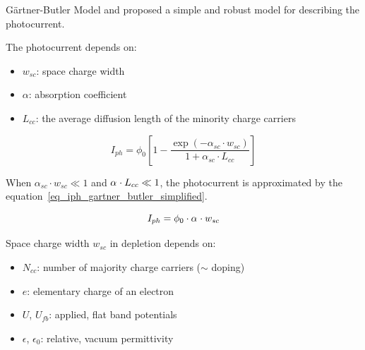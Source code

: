 \documentclass[10pt,compress]{beamer}
\begin{document}
    \begin{frame}[allowframebreaks=1.0]{Gärtner-Butler Model}
        \citet{gartner1959} and \citet{butler1977} proposed a simple and robust model for 
        describing the photocurrent.
        
        The photocurrent depends on:  
            \begin{itemize}
                \item $w_{sc}$: space charge width 
                \item $\alpha$: absorption coefficient
                \item $L_{cc }$: the average diffusion length of the minority charge carriers
            \end{itemize}

        \begin{equation}
            I_{ph} = \phi _0 \left[ 1 - \frac{\exp (-\alpha _{sc} \cdot w_{sc})}{1+\alpha _{sc} \cdot
            L_{cc}} \right]
            \label{eq_iph_gartner_butler}
        \end{equation}
        
        When $\alpha _{sc} \cdot w_{sc} \ll 1$ and $\alpha _{\sc} \cdot L_{cc} \ll 1$, 
        the photocurrent is approximated by the 
        equation~\ref{eq_iph_gartner_butler_simplified}.

        \begin{equation}
            I_{ph} = \phi _0 \cdot \alpha _{\sc} \cdot w_{sc}
            \label{eq_iph_gartner_butler_simplified}
        \end{equation}
        

        \framebreak
        Space charge width $w_{sc}$ in depletion depends on:
        \begin{itemize}
            \item $N_{cc}$: number of majority charge carriers ($\sim$ doping) 
            \item $e$: elementary charge of an electron 
            \item $U$, $U_{fb}$: applied, flat band potentials
            \item $\epsilon$, $\epsilon _0$: relative, vacuum permittivity
        \end{itemize}


\end{frame}
\end{document}
